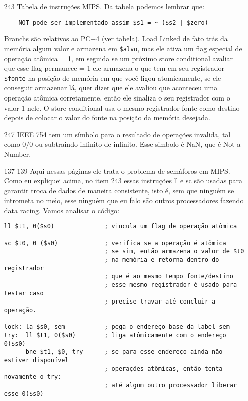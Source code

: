 \documentclass{article}
\begin{document}
\begin{enumerate}
\item[243] Tabela de instruções MIPS. Da tabela podemos lembrar que:

  \begin{verbatim}
    NOT pode ser implementado assim $s1 = ~ ($s2 | $zero)
  \end{verbatim}

Branchs são relativos ao PC+4 (ver tabela).
Load Linked de fato trás da memória algum valor e armazena em \verb|$alvo|, mas 
ele ativa um flag especial de operação atômica = 1, em seguida se um próximo 
store conditional avaliar que esse flag permanece = 1 ele armazena o que tem em 
seu registrador \verb|$fonte| na posição de memória em que você ligou 
atomicamente, se ele conseguir armazenar lá, quer dizer que ele avaliou que 
aconteceu uma operação atômica corretamente, então ele sinaliza o seu 
registrador com o valor 1 nele. O store conditional usa o mesmo registrador 
fonte como destino depois de colocar o valor do fonte na posição da memória 
desejada.

\item[247] IEEE 754 tem um símbolo para o resultado de operações invalida, 
tal como $0/0$ ou subtraindo infinito de infinito. Esse simbolo é NaN, que é 
Not a Number.

\item[137-139] Aqui nessas páginas ele trata o problema de semáforos em MIPS. 
Como eu expliquei acima, no item 243 essas instruções ll e sc são usadas para 
garantir troca de dados de maneira consistente, isto é, sem que ninguém se 
intrometa no meio, esse ninguém que eu falo são outros processadores fazendo 
data racing. Vamos analisar o código:

\begin{verbatim}
ll $t1, 0($s0)              ; vincula um flag de operação atômica

sc $t0, 0 ($s0)             ; verifica se a operação é atômica
                            ; se sim, então armazena o valor de $t0
                            ; na memória e retorna dentro do registrador
                            ; que é ao mesmo tempo fonte/destino
                            ; esse mesmo registrador é usado para testar caso 
                            ; precise travar até concluir a operação.

lock: la $s0, sem           ; pega o endereço base da label sem
try:  ll $t1, 0($s0)        ; liga atômicamente com o endereço 0($s0)
      bne $t1, $0, try      ; se para esse endereço ainda não estiver disponível
                            ; operações atômicas, então tenta novamente o try:
                            ; até algum outro processador liberar esse 0($s0)


\end{verbatim}
\end{enumerate}
\end{document}
